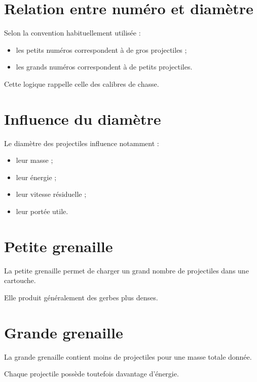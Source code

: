\section{Relation entre numéro et diamètre}

Selon la convention habituellement utilisée :

\begin{itemize}
    \item les petits numéros correspondent à de gros projectiles ;
    \item les grands numéros correspondent à de petits projectiles.
\end{itemize}

Cette logique rappelle celle des calibres de chasse.

\section{Influence du diamètre}

Le diamètre des projectiles influence notamment :

\begin{itemize}
    \item leur masse ;
    \item leur énergie ;
    \item leur vitesse résiduelle ;
    \item leur portée utile.
\end{itemize}

\section{Petite grenaille}

La petite grenaille permet de charger un grand nombre de projectiles dans une
cartouche.

Elle produit généralement des gerbes plus denses.

\section{Grande grenaille}

La grande grenaille contient moins de projectiles pour une masse totale donnée.

Chaque projectile possède toutefois davantage d'énergie.

